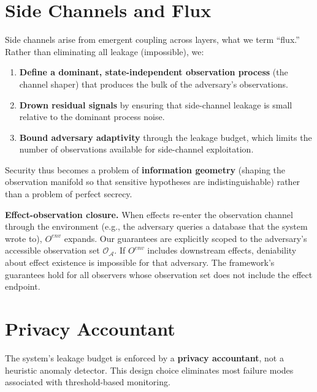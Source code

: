 \documentclass[11pt,a4paper]{article}
\begin{document}
\section{Side Channels and Flux}

Side channels arise from emergent coupling across layers, what we term ``flux.'' Rather than eliminating all leakage (impossible), we:

\begin{enumerate}
  \item \textbf{Define a dominant, state-independent observation process} (the channel shaper) that produces the bulk of the adversary's observations.
  \item \textbf{Drown residual signals} by ensuring that side-channel leakage is small relative to the dominant process noise.
  \item \textbf{Bound adversary adaptivity} through the leakage budget, which limits the number of observations available for side-channel exploitation.
\end{enumerate}

Security thus becomes a problem of \textbf{information geometry} (shaping the observation manifold so that sensitive hypotheses are indistinguishable) rather than a problem of perfect secrecy.

\textbf{Effect-observation closure.} When effects re-enter the observation channel through the environment (e.g., the adversary queries a database that the system wrote to), $O^{env}$ expands. Our guarantees are explicitly scoped to the adversary's accessible observation set $\mathcal{O}_\mathcal{A}$. If $O^{env}$ includes downstream effects, deniability about effect existence is impossible for that adversary. The framework's guarantees hold for all observers whose observation set does not include the effect endpoint.

\section{Privacy Accountant}

The system's leakage budget is enforced by a \textbf{privacy accountant}, not a heuristic anomaly detector. This design choice eliminates most failure modes associated with threshold-based monitoring.
\end{document}
